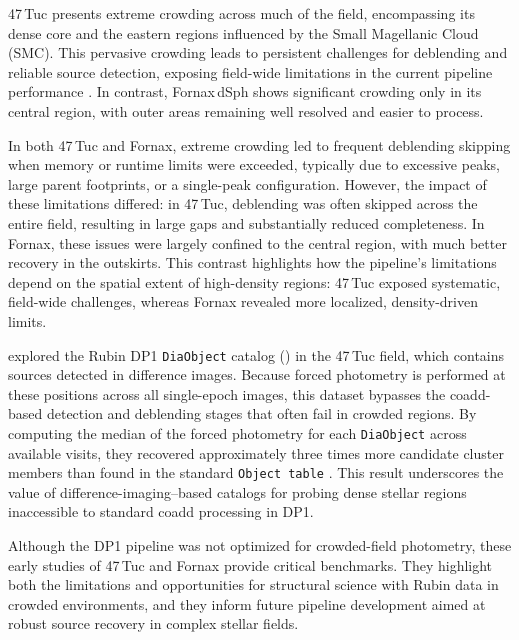 47\,Tuc presents extreme crowding across much of the field, encompassing its dense core and the eastern regions influenced by the Small Magellanic Cloud (SMC). 
This pervasive crowding leads to persistent challenges for deblending and reliable source detection, exposing field-wide limitations in the current pipeline performance \citep{Choi2025}.
In contrast, Fornax\,dSph shows significant crowding only in its central region, with outer areas remaining well resolved and easier to process. 

In both 47\,Tuc and Fornax, extreme crowding led to frequent deblending skipping when memory or runtime limits were exceeded, typically due to excessive peaks, large parent footprints, or a single-peak configuration. 
However, the impact of these limitations differed: in 47\,Tuc, deblending was often skipped across the entire field, resulting in large gaps and substantially reduced completeness. 
In Fornax, these issues were largely confined to the central region, with much better recovery in the outskirts. 
This contrast highlights how the pipeline’s limitations depend on the spatial extent of high-density regions: 47\,Tuc exposed systematic, field-wide challenges, whereas Fornax revealed more localized, density-driven limits.

\citet{Wainer2025} explored the Rubin DP1 \texttt{DiaObject} catalog () in the 47\,Tuc field, which contains sources detected in difference images. 
Because forced photometry is performed at these positions across all single-epoch images, this dataset bypasses the coadd-based detection and deblending stages that often fail in crowded regions. 
By computing the median of the forced photometry for each  \texttt{DiaObject} across available visits, they recovered approximately three times more candidate cluster members than found in the standard \texttt{Object table} \citep{Choi2025}. 
This result underscores the value of difference-imaging–based catalogs for probing dense stellar regions inaccessible to standard coadd processing in DP1.

Although the DP1 pipeline was not optimized for crowded-field photometry, these early studies of 47\,Tuc and Fornax provide critical benchmarks. 
They highlight both the limitations and opportunities for structural science with Rubin data in crowded environments, and they inform future pipeline development aimed at robust source recovery in complex stellar fields.

